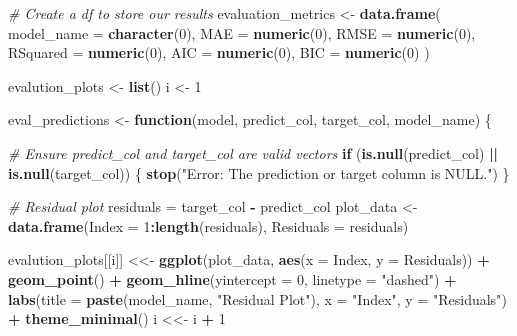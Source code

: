 \documentclass[
]{article}
\newenvironment{Shaded}{\begin{snugshade}}{\end{snugshade}}
\newcommand{\AttributeTok}[1]{\textcolor[rgb]{0.13,0.29,0.53}{#1}}
\newcommand{\CommentTok}[1]{\textcolor[rgb]{0.56,0.35,0.01}{\textit{#1}}}
\newcommand{\ControlFlowTok}[1]{\textcolor[rgb]{0.13,0.29,0.53}{\textbf{#1}}}
\newcommand{\DecValTok}[1]{\textcolor[rgb]{0.00,0.00,0.81}{#1}}
\newcommand{\FunctionTok}[1]{\textcolor[rgb]{0.13,0.29,0.53}{\textbf{#1}}}
\newcommand{\NormalTok}[1]{#1}
\newcommand{\OtherTok}[1]{\textcolor[rgb]{0.56,0.35,0.01}{#1}}
\newcommand{\SpecialCharTok}[1]{\textcolor[rgb]{0.81,0.36,0.00}{\textbf{#1}}}
\newcommand{\StringTok}[1]{\textcolor[rgb]{0.31,0.60,0.02}{#1}}
\begin{document}
\begin{Shaded}
\begin{Highlighting}[]
\CommentTok{\# Create a df to store our results}
\NormalTok{evaluation\_metrics }\OtherTok{\textless{}{-}} \FunctionTok{data.frame}\NormalTok{(}
  \AttributeTok{model\_name =} \FunctionTok{character}\NormalTok{(}\DecValTok{0}\NormalTok{), }
  \AttributeTok{MAE =} \FunctionTok{numeric}\NormalTok{(}\DecValTok{0}\NormalTok{),     }
  \AttributeTok{RMSE =} \FunctionTok{numeric}\NormalTok{(}\DecValTok{0}\NormalTok{),    }
  \AttributeTok{RSquared =} \FunctionTok{numeric}\NormalTok{(}\DecValTok{0}\NormalTok{),}
  \AttributeTok{AIC =} \FunctionTok{numeric}\NormalTok{(}\DecValTok{0}\NormalTok{),}
  \AttributeTok{BIC =} \FunctionTok{numeric}\NormalTok{(}\DecValTok{0}\NormalTok{)       }
\NormalTok{)}

\NormalTok{evalution\_plots }\OtherTok{\textless{}{-}} \FunctionTok{list}\NormalTok{()}
\NormalTok{i }\OtherTok{\textless{}{-}} \DecValTok{1}

\NormalTok{eval\_predictions }\OtherTok{\textless{}{-}} \ControlFlowTok{function}\NormalTok{(model, predict\_col, target\_col, model\_name) \{}
  
  \CommentTok{\# Ensure predict\_col and target\_col are valid vectors}
  \ControlFlowTok{if}\NormalTok{ (}\FunctionTok{is.null}\NormalTok{(predict\_col) }\SpecialCharTok{||} \FunctionTok{is.null}\NormalTok{(target\_col)) \{}
    \FunctionTok{stop}\NormalTok{(}\StringTok{"Error: The prediction or target column is NULL."}\NormalTok{)}
\NormalTok{  \}}

  \CommentTok{\# Residual plot}
\NormalTok{  residuals }\OtherTok{=}\NormalTok{ target\_col }\SpecialCharTok{{-}}\NormalTok{ predict\_col}
\NormalTok{  plot\_data }\OtherTok{\textless{}{-}} \FunctionTok{data.frame}\NormalTok{(}\AttributeTok{Index =} \DecValTok{1}\SpecialCharTok{:}\FunctionTok{length}\NormalTok{(residuals), }\AttributeTok{Residuals =}\NormalTok{ residuals)}
  
\NormalTok{  evalution\_plots[[i]] }\OtherTok{\textless{}\textless{}{-}} \FunctionTok{ggplot}\NormalTok{(plot\_data, }\FunctionTok{aes}\NormalTok{(}\AttributeTok{x =}\NormalTok{ Index, }\AttributeTok{y =}\NormalTok{ Residuals)) }\SpecialCharTok{+}
    \FunctionTok{geom\_point}\NormalTok{() }\SpecialCharTok{+}
    \FunctionTok{geom\_hline}\NormalTok{(}\AttributeTok{yintercept =} \DecValTok{0}\NormalTok{, }\AttributeTok{linetype =} \StringTok{"dashed"}\NormalTok{) }\SpecialCharTok{+}
    \FunctionTok{labs}\NormalTok{(}\AttributeTok{title =} \FunctionTok{paste}\NormalTok{(model\_name, }\StringTok{"Residual Plot"}\NormalTok{), }\AttributeTok{x =} \StringTok{"Index"}\NormalTok{, }\AttributeTok{y =} \StringTok{"Residuals"}\NormalTok{) }\SpecialCharTok{+}
    \FunctionTok{theme\_minimal}\NormalTok{()}
\NormalTok{  i }\OtherTok{\textless{}\textless{}{-}}\NormalTok{ i }\SpecialCharTok{+} \DecValTok{1}
  

\end{Highlighting}
\end{Shaded}
\end{document}
